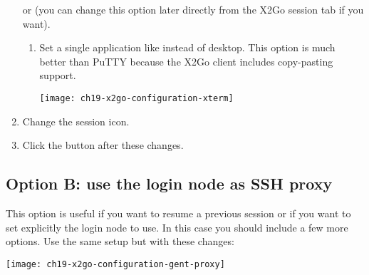 \begin{enumerate}
    or  (you can change this option later directly from the X2Go session tab if you want).
    \begin{enumerate}
      \item \strong{[optional]:} Set a single application like  instead of  desktop.
      \ifwindows This option is much better than PuTTY because the X2Go client includes copy-pasting support.\fi
      \begin{center}
        \texttt{[image: ch19-x2go-configuration-xterm]}
      \end{center}
    \end{enumerate}
    \item  \strong{[optional]:} Change the session icon.
    \item  Click the  button after these changes.
\end{enumerate}

\subsection{Option B: use the login node as SSH proxy}
\label{subsec:sessions-x2go-optionb}
This option is useful if you want to resume a previous session or if you want to set explicitly the login node to use.
In this case you should include a few more options. Use the same  setup but with these changes:

\begin{center}
\texttt{[image: ch19-x2go-configuration-gent-proxy]}
\end{center}

